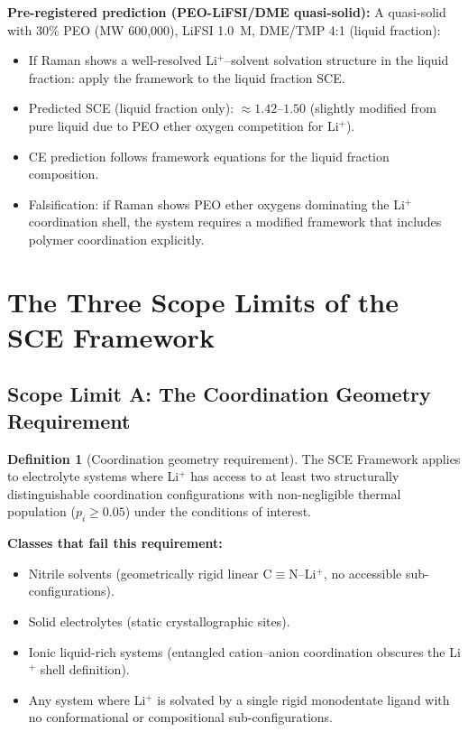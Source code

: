 \documentclass[11pt]{article}
\theoremstyle{plain}
\theoremstyle{definition}
\newtheorem{definition}{Definition}[section]
\theoremstyle{remark}
\begin{document}
\textbf{Pre-registered prediction (PEO-LiFSI/DME quasi-solid):}
A quasi-solid with 30\% PEO (MW 600,000), LiFSI 1.0~M,
DME/TMP 4:1 (liquid fraction):
\begin{itemize}[leftmargin=2em]
  \item If Raman shows a well-resolved Li$^+$--solvent solvation
        structure in the liquid fraction: apply the framework
        to the liquid fraction SCE.
  \item Predicted SCE (liquid fraction only): $\approx 1.42$--$1.50$
        (slightly modified from pure liquid due to PEO ether
        oxygen competition for Li$^+$).
  \item CE prediction follows framework equations for the
        liquid fraction composition.
  \item Falsification: if Raman shows PEO ether oxygens
        dominating the Li$^+$ coordination shell, the system
        requires a modified framework that includes polymer
        coordination explicitly.
\end{itemize}

\section{The Three Scope Limits of the SCE Framework}
\label{sec:scope_limits}

\subsection{Scope Limit A: The Coordination Geometry Requirement}

\begin{definition}[Coordination geometry requirement]
The SCE Framework applies to electrolyte systems where Li$^+$
has access to at least two structurally distinguishable
coordination configurations with non-negligible thermal
population ($p_i \geq 0.05$) under the conditions of interest.
\end{definition}

\textbf{Classes that fail this requirement:}
\begin{itemize}[leftmargin=2em]
  \item Nitrile solvents (geometrically rigid linear
        C$\equiv$N--Li$^+$, no accessible sub-configurations).
  \item Solid electrolytes (static crystallographic sites).
  \item Ionic liquid-rich systems (entangled cation--anion
        coordination obscures the Li$^+$ shell definition).
  \item Any system where Li$^+$ is solvated by a single
        rigid monodentate ligand with no conformational
        or compositional sub-configurations.
\end{itemize}
\end{document}
